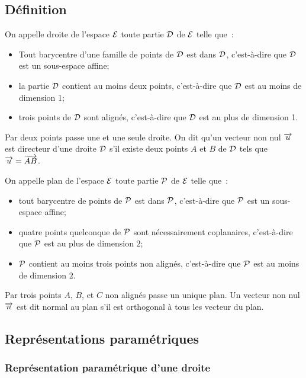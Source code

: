 \subsection{Définition}
\begin{defdef}
  On appelle droite de l'espace \(\E\) toute partie \(\Dr\) de \(\E\) telle que~:
  \begin{itemize}
  \item Tout barycentre d'une famille de points de \(\Dr\) est dans \(\Dr\), c'est-à-dire que \(\Dr\) est un sous-espace affine;
  \item la partie \(\Dr\) contient au moins deux points, c'est-à-dire que \(\Dr\) est au moins de dimension 1;
  \item trois points de \(\Dr\) sont alignés, c'est-à-dire que \(\Dr\) est au plus de dimension 1.
  \end{itemize}
Par deux points passe une et une seule droite. On dit qu'un vecteur non nul \(\vu\) est directeur d'une droite \(\Dr\) s'il existe deux points \(A\) et \(B\) de \(\Dr\) tels que \(\vu=\vect{AB}\).
\end{defdef}
\begin{defdef}
  On appelle plan de l'espace \(\E\) toute partie \(\P\) de \(\E\) telle que~:
  \begin{itemize}
  \item tout barycentre de points de \(\P\) est dans \(\P\), c'est-à-dire que \(\P\) est un sous-espace affine;
  \item quatre points quelconque de \(\P\) sont nécessairement coplanaires, c'est-à-dire que \(\P\) est au plus de dimension \(2\);
  \item \(\P\) contient au moins trois points non alignés, c'est-à-dire que \(\P\) est au moins de dimension \(2\).
  \end{itemize}
Par trois points \(A\), \(B\), et \(C\) non alignés passe un unique plan. Un vecteur non nul \(\vect{n}\) est dit normal au plan s'il est orthogonal à tous les vecteur du plan.
\end{defdef}

\subsection{Représentations paramétriques}
\subsubsection{Représentation paramétrique d'une droite}
